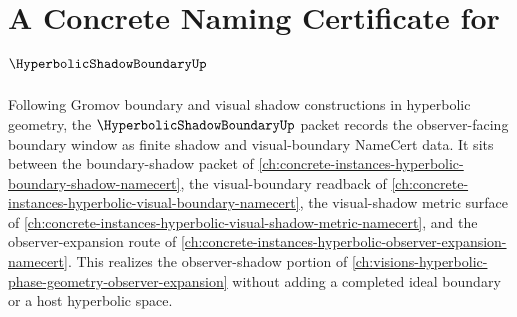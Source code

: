 \chapter{A Concrete Naming Certificate for $\HyperbolicShadowBoundaryUp$}
\label{ch:concrete-instances-hyperbolic-shadow-boundary-namecert}

Following Gromov boundary and visual shadow constructions in hyperbolic geometry, the $\HyperbolicShadowBoundaryUp$ packet records the observer-facing boundary window as finite shadow and visual-boundary NameCert data. It sits between the boundary-shadow packet of \autoref{ch:concrete-instances-hyperbolic-boundary-shadow-namecert}, the visual-boundary readback of \autoref{ch:concrete-instances-hyperbolic-visual-boundary-namecert}, the visual-shadow metric surface of \autoref{ch:concrete-instances-hyperbolic-visual-shadow-metric-namecert}, and the observer-expansion route of \autoref{ch:concrete-instances-hyperbolic-observer-expansion-namecert}. This realizes the observer-shadow portion of \autoref{ch:visions-hyperbolic-phase-geometry-observer-expansion} without adding a completed ideal boundary or a host hyperbolic space.

